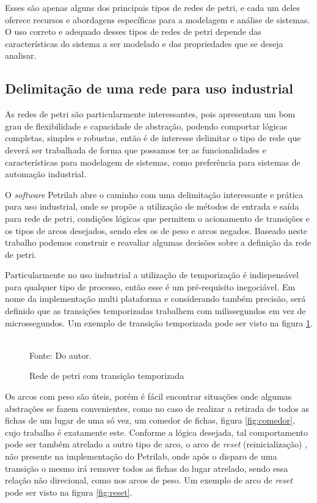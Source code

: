 Esses são apenas alguns dos principais tipos de redes de petri, e cada um deles oferece recursos e abordagens específicas para a modelagem e análise de sistemas. O uso correto e adequado desses tipos de redes de petri depende das características do sistema a ser modelado e das propriedades que se deseja analisar. 

\subsection{Delimitação de uma rede para uso industrial}

As redes de petri são particularmente interessantes, pois apresentam um bom grau de flexibilidade e capacidade de abstração, podendo comportar lógicas completas, simples e robustas, então é de interesse delimitar o tipo de rede que deverá ser trabalhada de forma que possamos ter as funcionalidades e características para modelagem de sistemas, como preferência para sistemas de automação industrial. 

O \textit{software} Petrilab \cite{de2015petrilab} abre o caminho com uma delimitação interessante e prática para uso industrial, onde se propõe a utilização de métodos de entrada e saída para rede de petri, condições lógicas que permitem o acionamento de transições e os tipos de arcos desejados, sendo eles os de peso e arcos negados. Baseado neste trabalho podemos construir e reavaliar algumas decisões sobre a definição da rede de petri. 

Particularmente no uso industrial a utilização de temporização é indispensável para qualquer tipo de processo, então esse é um pré-requisito inegociável. Em nome da implementação multi plataforma e considerando também precisão, será definido que as transições temporizadas trabalhem com milissegundos em vez de microssegundos. Um exemplo de transição temporizada pode ser visto na figura \ref{fig:petritime}. 

\begin{figure}[ht]
	\centering
	\caption{Rede de petri com transição temporizada}
	\\
	\label{fig:petritime}
	\footnotesize{Fonte: Do autor.}
\end{figure}

Os arcos com peso são úteis, porém é fácil encontrar situações onde algumas abstrações se fazem convenientes, como no caso de realizar a retirada de todos as fichas de um lugar de uma só vez, um comedor de fichas, figura \ref{fig:comedor}, cujo trabalho é exatamente este. Conforme a lógica desejada, tal comportamento pode ser também atrelado a outro tipo de arco, o arco de \textit{reset} (reinicialização) \cite{ResetNetsBetweenDecidabilityAndUndecidability}, não presente na implementação do Petrilab, onde após o disparo de uma transição o mesmo irá remover todos as fichas do lugar atrelado, sendo essa relação não direcional, como nos arcos de peso. Um exemplo de arco de \textit{reset} pode ser visto na figura \ref{fig:reset}. 

